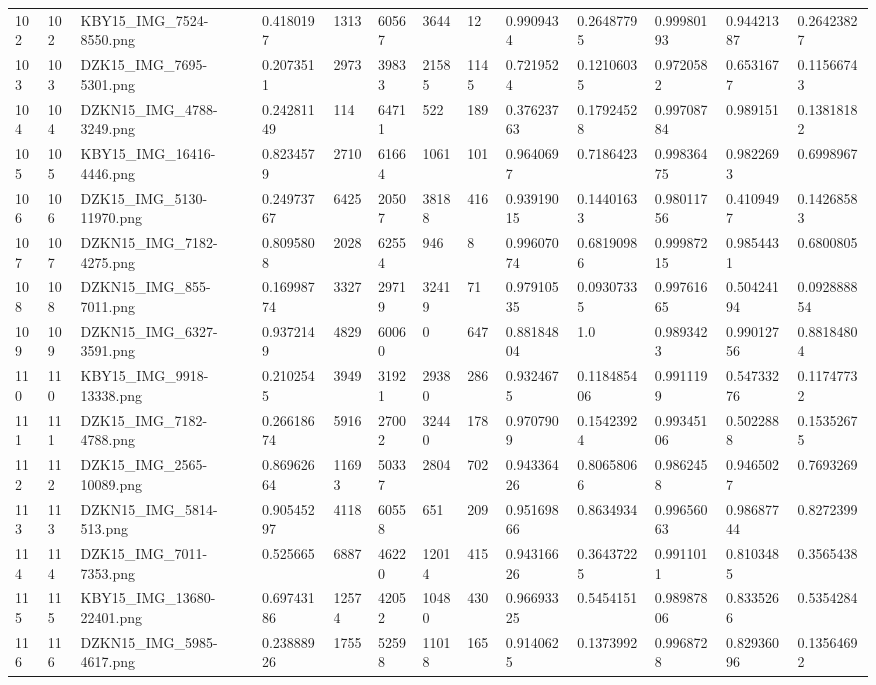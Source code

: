 \documentclass[11pt, a4paper, twoside]{report}
\begin{document}
\begin{longtable}[c]{@{}lllllllllllll@{}}
102 & 102 & KBY15\_IMG\_7524-8550.png & 0.4180197 & 1313 & 60567 & 3644 & 12 & 0.9909434 & 0.26487795 & 0.99980193 & 0.94421387 & 0.26423827 \\
103 & 103 & DZK15\_IMG\_7695-5301.png & 0.2073511 & 2973 & 39833 & 21585 & 1145 & 0.7219524 & 0.12106035 & 0.9720582 & 0.6531677 & 0.11566743 \\
104 & 104 & DZKN15\_IMG\_4788-3249.png & 0.24281149 & 114 & 64711 & 522 & 189 & 0.37623763 & 0.17924528 & 0.99708784 & 0.989151 & 0.13818182 \\
105 & 105 & KBY15\_IMG\_16416-4446.png & 0.8234579 & 2710 & 61664 & 1061 & 101 & 0.9640697 & 0.7186423 & 0.99836475 & 0.9822693 & 0.6998967 \\
106 & 106 & DZK15\_IMG\_5130-11970.png & 0.24973767 & 6425 & 20507 & 38188 & 416 & 0.93919015 & 0.14401633 & 0.98011756 & 0.4109497 & 0.14268583 \\
107 & 107 & DZKN15\_IMG\_7182-4275.png & 0.8095808 & 2028 & 62554 & 946 & 8 & 0.99607074 & 0.68190986 & 0.99987215 & 0.9854431 & 0.6800805 \\
108 & 108 & DZKN15\_IMG\_855-7011.png & 0.16998774 & 3327 & 29719 & 32419 & 71 & 0.97910535 & 0.09307335 & 0.99761665 & 0.50424194 & 0.092888854 \\
109 & 109 & DZKN15\_IMG\_6327-3591.png & 0.9372149 & 4829 & 60060 & 0 & 647 & 0.88184804 & 1.0 & 0.9893423 & 0.99012756 & 0.88184804 \\
110 & 110 & KBY15\_IMG\_9918-13338.png & 0.2102545 & 3949 & 31921 & 29380 & 286 & 0.9324675 & 0.118485406 & 0.9911199 & 0.54733276 & 0.11747732 \\
111 & 111 & DZK15\_IMG\_7182-4788.png & 0.26618674 & 5916 & 27002 & 32440 & 178 & 0.9707909 & 0.15423924 & 0.99345106 & 0.5022888 & 0.15352675 \\
112 & 112 & DZK15\_IMG\_2565-10089.png & 0.86962664 & 11693 & 50337 & 2804 & 702 & 0.94336426 & 0.80658066 & 0.9862458 & 0.9465027 & 0.7693269 \\
113 & 113 & DZKN15\_IMG\_5814-513.png & 0.90545297 & 4118 & 60558 & 651 & 209 & 0.95169866 & 0.8634934 & 0.99656063 & 0.98687744 & 0.8272399 \\
114 & 114 & DZK15\_IMG\_7011-7353.png & 0.525665 & 6887 & 46220 & 12014 & 415 & 0.94316626 & 0.36437225 & 0.9911011 & 0.8103485 & 0.3565438 \\
115 & 115 & KBY15\_IMG\_13680-22401.png & 0.69743186 & 12574 & 42052 & 10480 & 430 & 0.96693325 & 0.5454151 & 0.98987806 & 0.8335266 & 0.5354284 \\
116 & 116 & DZKN15\_IMG\_5985-4617.png & 0.23888926 & 1755 & 52598 & 11018 & 165 & 0.9140625 & 0.1373992 & 0.9968728 & 0.82936096 & 0.13564692 \\

\end{longtable}
\end{document}
